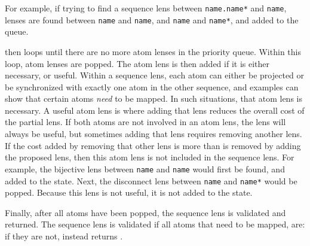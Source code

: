 \documentclass[acmsmall,screen,anonymous]{acmart}
\begin{document}
For example, if trying to find a sequence lens between \lstinline{name.name*}
and \lstinline{name}, lenses are found between \lstinline{name} and
\lstinline{name}, and \lstinline{name} and \lstinline{name*}, and added to the
queue.

\GreedySeqSynth then loops until there are no more atom lenses in the priority
queue. Within this loop, atom lenses are popped. The atom lens is then added if
it is either necessary, or useful. Within a sequence lens, each atom can either
be projected or be synchronized with exactly one atom in the other sequence, and
examples can show that certain atoms \emph{need} to be mapped. In such
situations, that atom lens is necessary. A useful atom lens is where adding that
lens reduces the overall cost of the partial lens. If both atoms are not
involved in an atom lens, the lens will always be useful, but sometimes adding
that lens requires removing another lens. If the cost added by removing that
other lens is more than is removed by adding the proposed lens, then this atom
lens is not included in the sequence lens. For example, the bijective lens
between \lstinline{name} and \lstinline{name} would first be found, and added to
the state.  Next, the disconnect lens between \lstinline{name} and
\lstinline{name*} would be popped.  Because this lens is not useful, it is not
added to the state.

Finally, after all atoms have been
popped, the sequence lens is validated and returned. The sequence lens is
validated if all atoms that need to be mapped, are: if they are not,
 instead returns \None.
\end{document}

